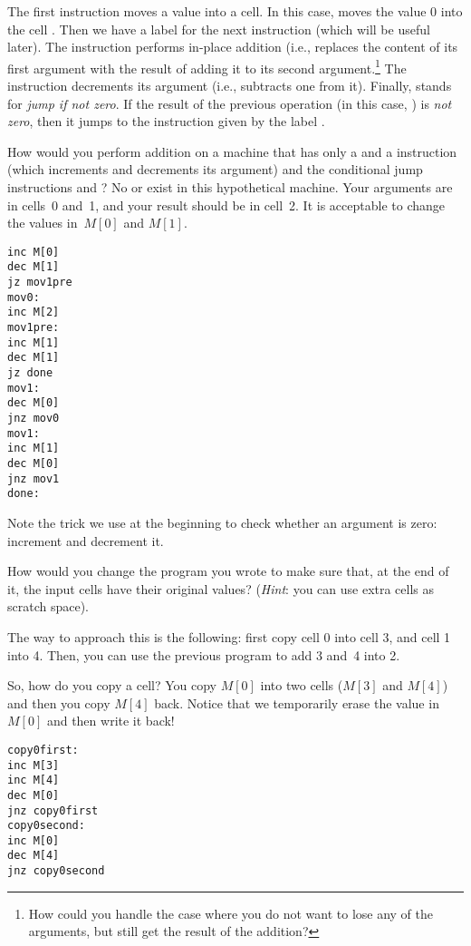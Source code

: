 The first instruction  moves a value into a cell. In this
case, moves the value 0 into the cell . Then we have a label
for the next instruction (which will be useful later). The 
instruction performs in-place addition (i.e., replaces the content of its first
argument with the result of adding it to its second argument.\footnote{How could
you handle the case where you do not want to lose any of the arguments, but
still get the result of the addition?} The  instruction
decrements its argument (i.e., subtracts one from it). Finally,
 stands for \emph{jump if not zero}. If the result of the
previous operation (in this case, ) is \emph{not zero}, then
it jumps to the instruction given by the label .

\begin{exercise}
How would you perform addition on a machine that has only a 
and a  instruction (which increments and decrements its
argument) and the conditional jump instructions  and
? No  or  exist in this
hypothetical machine. Your arguments are in cells~0 and~1, and your result
should be in cell~2. It is acceptable to change the values in~$M[0]$ and
$M[1]$.
\begin{solution}
\begin{verbatim}
inc M[0]
dec M[1]
jz mov1pre
mov0:
inc M[2]
mov1pre:
inc M[1]
dec M[1]
jz done
mov1:
dec M[0]
jnz mov0
mov1:
inc M[1]
dec M[0]
jnz mov1
done:
\end{verbatim}

Note the trick we use at the beginning to check whether an argument is zero:
increment and decrement it.
\end{solution}
\end{exercise}

\begin{exercise}
How would you change the program you wrote to make sure that, at the end of it,
the input cells have their original values? (\emph{Hint}: you can use extra
cells as scratch space).
\begin{solution}
The way to approach this is the following: first copy cell 0 into cell 3, and
cell 1 into 4. Then, you can use the previous program to add 3 and~4 into 2.

So, how do you copy a cell? You copy $M[0]$ into two cells ($M[3]$ and $M[4]$)
and then you copy $M[4]$ back. Notice that we temporarily erase the value in
$M[0]$ and then write it back!

\begin{verbatim}
copy0first:
inc M[3]
inc M[4]
dec M[0]
jnz copy0first
copy0second:
inc M[0]
dec M[4]
jnz copy0second
\end{verbatim}
\end{solution}
\end{exercise}

